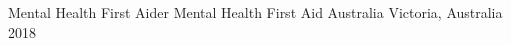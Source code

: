 \begin{cvhonors}
  \cvhonor
    {Mental Health First Aider}
    {Mental Health First Aid Australia}
    {Victoria, Australia}
    {2018}
\end{cvhonors}
